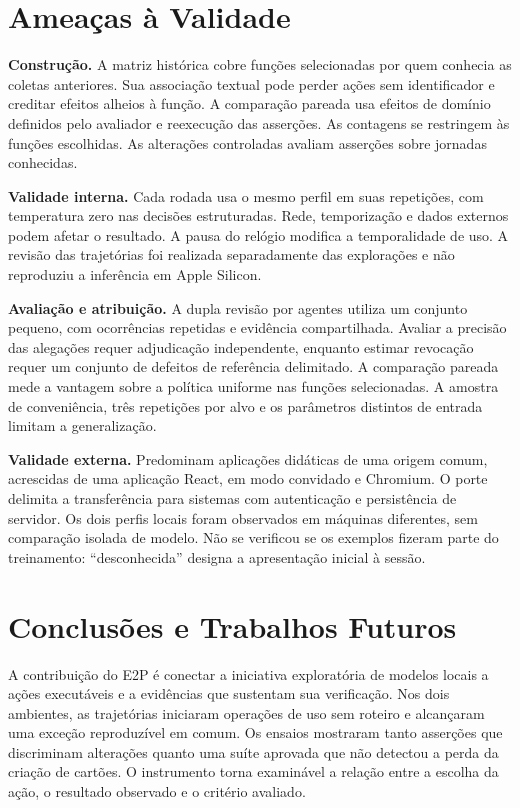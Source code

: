 \documentclass[12pt]{article}
\begin{document}
\section{Ameaças à Validade}\label{sec:threats}
\textbf{Construção.} A matriz histórica cobre funções selecionadas por quem conhecia as coletas anteriores. Sua associação textual pode perder ações sem identificador e creditar efeitos alheios à função. A comparação pareada usa efeitos de domínio definidos pelo avaliador e reexecução das asserções. As contagens se restringem às funções escolhidas. As alterações controladas avaliam asserções sobre jornadas conhecidas.

\textbf{Validade interna.} Cada rodada usa o mesmo perfil em suas repetições, com temperatura zero nas decisões estruturadas. Rede, temporização e dados externos podem afetar o resultado. A pausa do relógio modifica a temporalidade de uso. A revisão das trajetórias foi realizada separadamente das explorações e não reproduziu a inferência em Apple Silicon.

\textbf{Avaliação e atribuição.} A dupla revisão por agentes utiliza um conjunto pequeno, com ocorrências repetidas e evidência compartilhada. Avaliar a precisão das alegações requer adjudicação independente, enquanto estimar revocação requer um conjunto de defeitos de referência delimitado. A comparação pareada mede a vantagem sobre a política uniforme nas funções selecionadas. A amostra de conveniência, três repetições por alvo e os parâmetros distintos de entrada limitam a generalização.

\textbf{Validade externa.} Predominam aplicações didáticas de uma origem comum, acrescidas de uma aplicação React, em modo convidado e Chromium. O porte delimita a transferência para sistemas com autenticação e persistência de servidor. Os dois perfis locais foram observados em máquinas diferentes, sem comparação isolada de modelo. Não se verificou se os exemplos fizeram parte do treinamento: ``desconhecida'' designa a apresentação inicial à sessão.

\section{Conclusões e Trabalhos Futuros}\label{sec:conclusion}
A contribuição do E2P é conectar a iniciativa exploratória de modelos locais a ações executáveis e a evidências que sustentam sua verificação. Nos dois ambientes, as trajetórias iniciaram operações de uso sem roteiro e alcançaram uma exceção reproduzível em comum. Os ensaios mostraram tanto asserções que discriminam alterações quanto uma suíte aprovada que não detectou a perda da criação de cartões. O instrumento torna examinável a relação entre a escolha da ação, o resultado observado e o critério avaliado.
\end{document}
